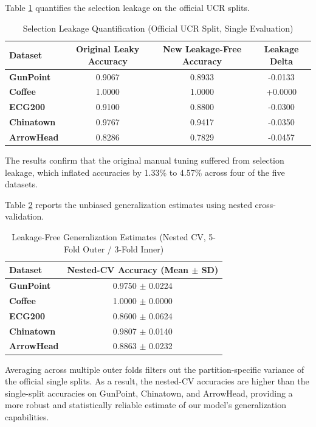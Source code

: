 \documentclass[conference]{IEEEtran}
\begin{document}
Table \ref{tab:selection_leakage} quantifies the selection leakage on the official UCR splits.

\begin{table}[htbp]
\caption{Selection Leakage Quantification (Official UCR Split, Single Evaluation)}
\label{tab:selection_leakage}
\centering
\begin{tabular}{|l|c|c|c|}
\hline
Dataset & Original Leaky Accuracy & New Leakage-Free Accuracy & Leakage Delta \\ \hline
\textbf{GunPoint} & 0.9067 & 0.8933 & -0.0133 \\ \hline
\textbf{Coffee} & 1.0000 & 1.0000 & +0.0000 \\ \hline
\textbf{ECG200} & 0.9100 & 0.8800 & -0.0300 \\ \hline
\textbf{Chinatown} & 0.9767 & 0.9417 & -0.0350 \\ \hline
\textbf{ArrowHead} & 0.8286 & 0.7829 & -0.0457 \\ \hline
\end{tabular}
\end{table}

The results confirm that the original manual tuning suffered from selection leakage, which inflated accuracies by 1.33\% to 4.57\% across four of the five datasets.

Table \ref{tab:leakage_free_gen} reports the unbiased generalization estimates using nested cross-validation.

\begin{table}[htbp]
\caption{Leakage-Free Generalization Estimates (Nested CV, 5-Fold Outer / 3-Fold Inner)}
\label{tab:leakage_free_gen}
\centering
\begin{tabular}{|l|c|}
\hline
Dataset & Nested-CV Accuracy (Mean $\pm$ SD) \\ \hline
\textbf{GunPoint} & 0.9750 $\pm$ 0.0224 \\ \hline
\textbf{Coffee} & 1.0000 $\pm$ 0.0000 \\ \hline
\textbf{ECG200} & 0.8600 $\pm$ 0.0624 \\ \hline
\textbf{Chinatown} & 0.9807 $\pm$ 0.0140 \\ \hline
\textbf{ArrowHead} & 0.8863 $\pm$ 0.0232 \\ \hline
\end{tabular}
\end{table}

Averaging across multiple outer folds filters out the partition-specific variance of the official single splits. As a result, the nested-CV accuracies are higher than the single-split accuracies on GunPoint, Chinatown, and ArrowHead, providing a more robust and statistically reliable estimate of our model's generalization capabilities.
\end{document}
